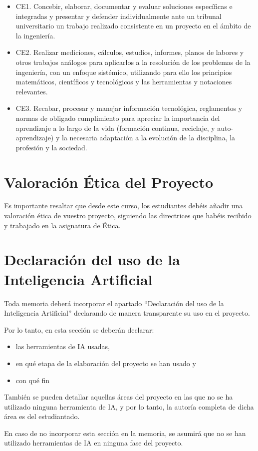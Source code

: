 \begin{itemize}
  \item CE1. Concebir, elaborar, documentar y evaluar soluciones específicas e integradas y presentar y defender individualmente ante un tribunal universitario un trabajo realizado consistente en un proyecto en el ámbito de la ingeniería.
  \item CE2. Realizar mediciones, cálculos, estudios, informes, planos de labores y otros trabajos análogos para aplicarlos a la resolución de los problemas de la ingeniería, con un enfoque sistémico, utilizando para ello los principios matemáticos, científicos y tecnológicos y las herramientas y notaciones relevantes.
  \item CE3. Recabar, procesar y manejar información tecnológica, reglamentos y normas de obligado cumplimiento para apreciar la importancia del aprendizaje a lo largo de la vida (formación continua, reciclaje, y auto-aprendizaje) y la necesaria adaptación a la evolución de la disciplina, la profesión y la sociedad.
\end{itemize}

\chapter{Valoración Ética del Proyecto}

Es importante resaltar que desde este curso, los estudiantes debéis añadir una valoración ética de vuestro proyecto, siguiendo las directrices que habéis recibido y trabajado en la asignatura de Ética.

\chapter{Declaración del uso de la Inteligencia Artificial}

Toda memoria deberá incorporar el apartado “Declaración del uso de la Inteligencia Artificial” declarando de manera transparente su uso en el proyecto.

Por lo tanto, en esta sección se deberán declarar:
\begin{itemize}
  \item las herramientas de IA usadas,
  \item en qué etapa de la elaboración del proyecto se han usado y
  \item con qué fin
\end{itemize}

También se pueden detallar aquellas áreas del proyecto en las que no se ha utilizado ninguna herramienta de IA, y por lo tanto, la autoría completa de dicha área es del estudiantado.

En caso de no incorporar esta sección en la memoria, se asumirá que no se han utilizado herramientas de IA en ninguna fase del proyecto.

